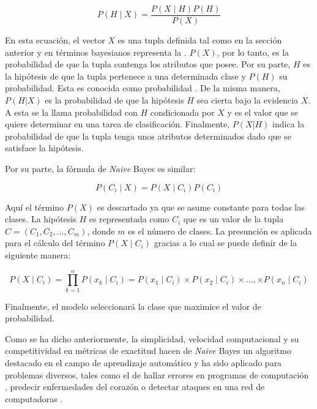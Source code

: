 \begin{equation}
   P(H \mid X) = \frac{P(X \mid H) P(H)}{P(X)}
\end{equation}

En esta ecuación, el vector $X$ es una tupla definida tal como en la sección
anterior y en términos bayesianos representa la . $P(X)$,
por lo tanto, es la probabilidad de que la tupla contenga los atributos que
posee. Por su parte, $H$ es la hipótesis de que la tupla pertenece a una
determinada clase y $P(H)$ su probabilidad. Esta es conocida como probabilidad
. De la misma manera, $P(H|X)$ es la probabilidad de que la
hipótesis $H$ sea cierta bajo la evidencia $X$. A esta se la llama probabilidad
 con $H$ condicionada por $X$ y es el valor que se quiere
determinar en una tarea de clasificación.  Finalmente, $P(X|H)$ indica la
probabilidad de que la tupla tenga unos atributos determinados dado que se
satisface la hipótesis.

Por su parte, la fórmula de \textit{Naive} Bayes es similar:

\begin{equation}
   P(C_{i} \mid X) = P(X \mid C_{i}) P(C_{i})
\end{equation}

Aquí el término $P(X)$ es descartado ya que se asume constante para todas las
clases. La hipótesis $H$ es representada como $C_{i}$ que es un valor de la
tupla $C=(C_{1},C_{2},\dots,C_{m})$, donde $m$ es el número de clases. La
presunción  es aplicada para el cálculo del término $P(X \mid
C_{i})$ gracias a lo cual se puede definir de la siguiente manera:

\begin{equation} 
   P(X \mid C_{i}) = \prod\limits_{k=1}^n{P(x_{k} \mid C_{i})} =
   P(x_{1} \mid C_{i}) \times 
   P(x_{2} \mid C_{i}) \times \dots, \times 
   P(x_{n} \mid C_{i})   
\end{equation}

Finalmente, el modelo seleccionará la clase que maximice el valor de
probabilidad.  

Como se ha dicho anteriormente, la simplicidad, velocidad computacional y su
competitividad en métricas de exactitud hacen de \textit{Naive} Bayes un
algoritmo destacado en el campo de aprendizaje automático
\cite{wickramasinghe_naive_2020} y ha sido aplicado para problemas diversos,
tales como el de hallar errores en programas de computación
\cite{arar_feature_2017}, predecir enfermedades del corazón
\cite{dulhare_prediction_2018} o detectar ataques en una red de computadoras
\cite{kalutarage_detecting_2015}.



